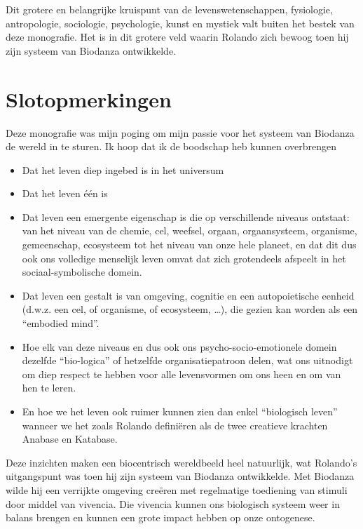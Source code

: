 \documentclass[
  11pt,
]{book}
\begin{document}
Dit grotere en belangrijke kruispunt van de levenswetenschappen, fysiologie, antropologie, sociologie, psychologie, kunst en mystiek valt buiten het bestek van deze monografie. Het is in dit grotere veld waarin Rolando zich bewoog toen hij zijn systeem van Biodanza ontwikkelde.

\hypertarget{slotopmerkingen}{%
\chapter{Slotopmerkingen}\label{slotopmerkingen}}

Deze monografie was mijn poging om mijn passie voor het systeem van Biodanza de wereld in te sturen. Ik hoop dat ik de boodschap heb kunnen overbrengen

\begin{itemize}
\item
  Dat het leven diep ingebed is in het universum
\item
  Dat het leven één is
\item
  Dat leven een emergente eigenschap is die op verschillende niveaus ontstaat: van het niveau van de chemie, cel, weefsel, orgaan, orgaansysteem, organisme, gemeenschap, ecosysteem tot het niveau van onze hele planeet, en dat dit dus ook ons volledige menselijk leven omvat dat zich grotendeels afspeelt in het sociaal-symbolische domein.
\item
  Dat leven een gestalt is van omgeving, cognitie en een autopoietische eenheid (d.w.z. een cel, of organisme, of ecosysteem, \ldots), die gezien kan worden als een ``embodied mind''.
\item
  Hoe elk van deze niveaus en dus ook ons psycho-socio-emotionele domein dezelfde ``bio-logica'' of hetzelfde organisatiepatroon delen, wat ons uitnodigt om diep respect te hebben voor alle levensvormen om ons heen en om van hen te leren.
\item
  En hoe we het leven ook ruimer kunnen zien dan enkel ``biologisch leven'' wanneer we het zoals Rolando definiëren als de twee creatieve krachten Anabase en Katabase.
\end{itemize}

Deze inzichten maken een biocentrisch wereldbeeld heel natuurlijk, wat Rolando's uitgangspunt was toen hij zijn systeem van Biodanza ontwikkelde. Met Biodanza wilde hij een verrijkte omgeving creëren met regelmatige toediening van stimuli door middel van vivencia. Die vivencia kunnen ons biologisch systeem weer in balans brengen en kunnen een grote impact hebben op onze ontogenese.
\end{document}

